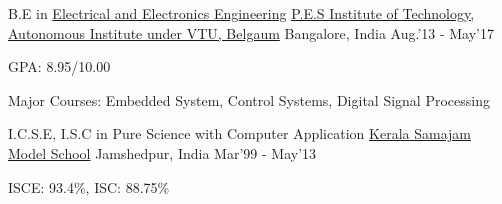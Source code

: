 \begin{cventries}
	\cventry
	{B.E in \href{https://eee.pes.edu/}{Electrical and Electronics Engineering}}
	{\href{https://pesit.pes.edu/}{P.E.S Institute of Technology, Autonomous Institute under VTU, Belgaum}}
	{Bangalore, India}
	{Aug.'13 - May'17}
	{
		\begin{cvitems}
		\item{GPA: 8.95/10.00}
		\item{Major Courses: Embedded System, Control Systems, Digital Signal Processing}
		\end{cvitems}
	}
\end{cventries}
\begin{cventries}
	\cventry
	{I.C.S.E, I.S.C in {Pure Science with Computer Application}}
	{\href{https://ksms.ac.in/}{Kerala Samajam Model School}}
	{Jamshedpur, India}
	{Mar'99 - May'13}
	{
		\begin{cvitems}
		\item{ISCE: 93.4\%, ISC: 88.75\%}
		\end{cvitems}
	}
\end{cventries}
